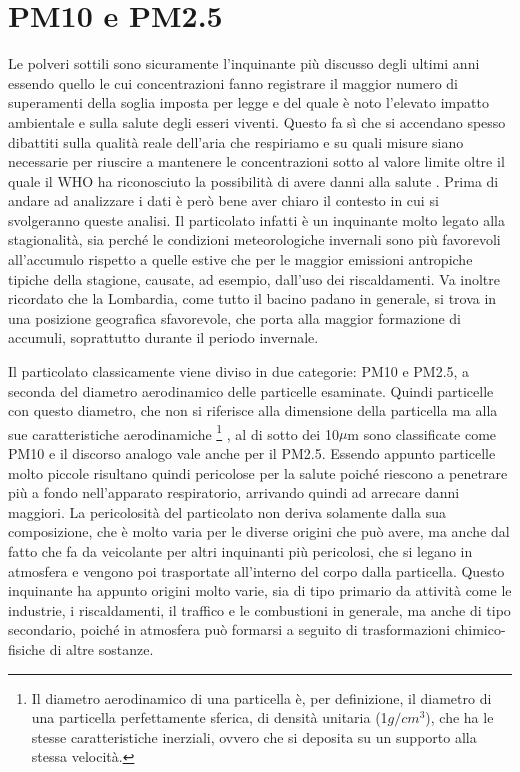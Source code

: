 \documentclass[a4paper]{report}
\begin{document}
\section{PM10 e PM2.5}
Le polveri sottili sono sicuramente l'inquinante più discusso degli ultimi anni essendo quello le cui concentrazioni fanno registrare il maggior numero di superamenti della soglia imposta per legge e del quale è noto l'elevato impatto ambientale e sulla salute degli esseri viventi. Questo fa sì che si accendano spesso dibattiti sulla qualità reale dell'aria che respiriamo e su quali misure siano necessarie per riuscire a mantenere le concentrazioni sotto al valore limite oltre il quale il WHO ha riconosciuto la possibilità di avere danni alla salute \cite{world2006air}. Prima di andare ad analizzare i dati è però bene aver chiaro il contesto in cui si svolgeranno queste analisi. Il particolato infatti è un inquinante molto legato alla stagionalità, sia perché le condizioni meteorologiche invernali sono più favorevoli all'accumulo rispetto a quelle estive che per le maggior emissioni antropiche tipiche della stagione, causate, ad esempio, dall'uso dei riscaldamenti. Va inoltre ricordato che la Lombardia, come tutto il bacino padano in generale, si trova in una posizione geografica sfavorevole, che porta alla maggior formazione di accumuli, soprattutto durante il periodo invernale.

Il particolato classicamente viene diviso in due categorie: PM10 e PM2.5, a seconda del diametro aerodinamico delle particelle esaminate. Quindi particelle con questo diametro, che non si riferisce alla dimensione della particella ma alla sue caratteristiche aerodinamiche
\footnote{Il diametro aerodinamico di una particella è, per definizione, il diametro di una particella perfettamente sferica, di densità unitaria (1$g/cm^3$), che ha le stesse caratteristiche inerziali, ovvero che si deposita su un supporto alla stessa velocità.}
, al di sotto dei 10$\mu$m sono classificate come PM10 e il discorso analogo vale anche per il PM2.5. Essendo appunto particelle molto piccole risultano quindi pericolose per la salute poiché riescono a penetrare più a fondo nell'apparato respiratorio, arrivando quindi ad arrecare danni maggiori.
La pericolosità del particolato non deriva solamente dalla sua composizione, che è molto varia per le diverse origini che può avere, ma anche dal fatto che fa da veicolante per altri inquinanti più pericolosi, che si legano in atmosfera e vengono poi trasportate all'interno del corpo dalla particella. Questo inquinante ha appunto origini molto varie, sia di tipo primario da attività come le industrie, i riscaldamenti, il traffico e le combustioni in generale, ma anche di tipo secondario, poiché in atmosfera può formarsi a seguito di trasformazioni chimico-fisiche di altre sostanze.
\end{document}
